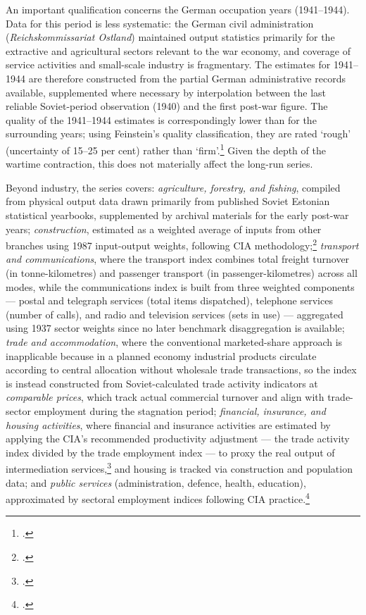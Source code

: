 \documentclass[12pt,a4paper]{article}
\begin{document}
An important qualification concerns the German occupation years (1941--1944). Data for this period is less systematic: the German civil administration (\textit{Reichskommissariat Ostland}) maintained output statistics primarily for the extractive and agricultural sectors relevant to the war economy, and coverage of service activities and small-scale industry is fragmentary. The estimates for 1941--1944 are therefore constructed from the partial German administrative records available, supplemented where necessary by interpolation between the last reliable Soviet-period observation (1940) and the first post-war figure. The quality of the 1941--1944 estimates is correspondingly lower than for the surrounding years; using Feinstein's quality classification, they are rated `rough' (uncertainty of 15--25 per cent) rather than `firm'.\footnote{\autocite[21]{feinstein1972}.} Given the depth of the wartime contraction, this does not materially affect the long-run series.

Beyond industry, the series covers: \textit{agriculture, forestry, and fishing}, compiled from physical output data drawn primarily from published Soviet Estonian statistical yearbooks, supplemented by archival materials for the early post-war years; \textit{construction}, estimated as a weighted average of inputs from other branches using 1987 input-output weights, following CIA methodology;\footnote{\autocite[66--69, 82--85, 86--89]{wbinputoutput1987}.} \textit{transport and communications}, where the transport index combines total freight turnover (in tonne-kilometres) and passenger transport (in passenger-kilometres) across all modes, while the communications index is built from three weighted components — postal and telegraph services (total items dispatched), telephone services (number of calls), and radio and television services (sets in use) — aggregated using 1937 sector weights since no later benchmark disaggregation is available; \textit{trade and accommodation}, where the conventional marketed-share approach is inapplicable because in a planned economy industrial products circulate according to central allocation without wholesale trade transactions, so the index is instead constructed from Soviet-calculated trade activity indicators at \textit{comparable prices}, which track actual commercial turnover and align with trade-sector employment during the stagnation period; \textit{financial, insurance, and housing activities}, where financial and insurance activities are estimated by applying the CIA's recommended productivity adjustment — the trade activity index divided by the trade employment index — to proxy the real output of intermediation services,\footnote{\autocite[319]{Maddison1998b}.} and housing is tracked via construction and population data; and \textit{public services} (administration, defence, health, education), approximated by sectoral employment indices following CIA practice.\footnote{\autocite[319]{Maddison1998b}.}
\end{document}
